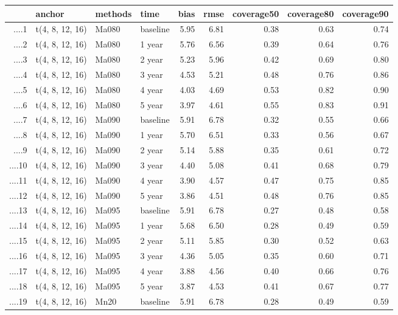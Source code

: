 \begin{table}[ht]
\centering
\begin{tabular}{rlllrrrrr}
  \hline
 & anchor & methods & time & bias & rmse & coverage50 & coverage80 & coverage90 \\ 
  \hline
....1 & t(4, 8, 12, 16) & Ma080 & baseline & 5.95 & 6.81 & 0.38 & 0.63 & 0.74 \\ 
  ....2 & t(4, 8, 12, 16) & Ma080 & 1 year & 5.76 & 6.56 & 0.39 & 0.64 & 0.76 \\ 
  ....3 & t(4, 8, 12, 16) & Ma080 & 2 year & 5.23 & 5.96 & 0.42 & 0.69 & 0.80 \\ 
  ....4 & t(4, 8, 12, 16) & Ma080 & 3 year & 4.53 & 5.21 & 0.48 & 0.76 & 0.86 \\ 
  ....5 & t(4, 8, 12, 16) & Ma080 & 4 year & 4.03 & 4.69 & 0.53 & 0.82 & 0.90 \\ 
  ....6 & t(4, 8, 12, 16) & Ma080 & 5 year & 3.97 & 4.61 & 0.55 & 0.83 & 0.91 \\ 
  ....7 & t(4, 8, 12, 16) & Ma090 & baseline & 5.91 & 6.78 & 0.32 & 0.55 & 0.66 \\ 
  ....8 & t(4, 8, 12, 16) & Ma090 & 1 year & 5.70 & 6.51 & 0.33 & 0.56 & 0.67 \\ 
  ....9 & t(4, 8, 12, 16) & Ma090 & 2 year & 5.14 & 5.88 & 0.35 & 0.61 & 0.72 \\ 
  ....10 & t(4, 8, 12, 16) & Ma090 & 3 year & 4.40 & 5.08 & 0.41 & 0.68 & 0.79 \\ 
  ....11 & t(4, 8, 12, 16) & Ma090 & 4 year & 3.90 & 4.57 & 0.47 & 0.75 & 0.85 \\ 
  ....12 & t(4, 8, 12, 16) & Ma090 & 5 year & 3.86 & 4.51 & 0.48 & 0.76 & 0.85 \\ 
  ....13 & t(4, 8, 12, 16) & Ma095 & baseline & 5.91 & 6.78 & 0.27 & 0.48 & 0.58 \\ 
  ....14 & t(4, 8, 12, 16) & Ma095 & 1 year & 5.68 & 6.50 & 0.28 & 0.49 & 0.59 \\ 
  ....15 & t(4, 8, 12, 16) & Ma095 & 2 year & 5.11 & 5.85 & 0.30 & 0.52 & 0.63 \\ 
  ....16 & t(4, 8, 12, 16) & Ma095 & 3 year & 4.36 & 5.05 & 0.35 & 0.60 & 0.71 \\ 
  ....17 & t(4, 8, 12, 16) & Ma095 & 4 year & 3.88 & 4.56 & 0.40 & 0.66 & 0.76 \\ 
  ....18 & t(4, 8, 12, 16) & Ma095 & 5 year & 3.87 & 4.53 & 0.41 & 0.67 & 0.77 \\ 
  ....19 & t(4, 8, 12, 16) & Mn20 & baseline & 5.91 & 6.78 & 0.28 & 0.49 & 0.59 \\ 

\end{tabular}
\end{table}
